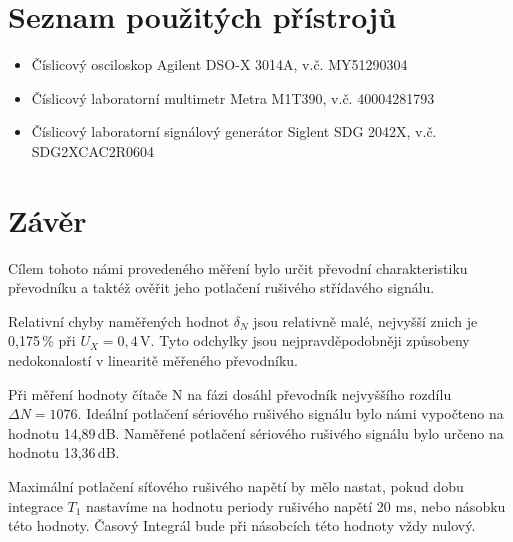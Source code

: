 \documentclass[a4paper, czech]{article}
\begin{document}
\section{Seznam použitých přístrojů}

\begin{itemize}
    \item Číslicový osciloskop Agilent DSO-X 3014A, v.č. MY51290304
    \item Číslicový laboratorní multimetr Metra M1T390, v.č. 40004281793
    \item Číslicový laboratorní signálový generátor Siglent SDG 2042X, v.č. SDG2XCAC2R0604
\end{itemize}

\section{Závěr}

Cílem tohoto námi provedeného měření bylo určit převodní charakteristiku převodníku a taktéž ověřit jeho potlačení rušivého střídavého signálu.

Relativní chyby naměřených hodnot $\delta_N$ jsou relativně malé, nejvyšší znich je 0,175\,\% při $U_X = 0,4\,$V.
Tyto odchylky jsou nejpravděpodobněji způsobeny nedokonalostí v linearitě měřeného převodníku.

Při měření hodnoty čítače N na fázi dosáhl převodník nejvyššího rozdílu $\Delta N = 1076$.
Ideální potlačení sériového rušivého signálu bylo námi vypočteno na hodnotu 14,89\,dB.
Naměřené potlačení sériového rušivého signálu bylo určeno na hodnotu 13,36\,dB.

Maximální potlačení síťového rušivého napětí by mělo nastat, pokud dobu integrace $T_1$ nastavíme na hodnotu periody rušivého napětí 20 ms, nebo násobku této hodnoty. Časový Integrál bude při násobcích této hodnoty vždy nulový.
\end{document}

